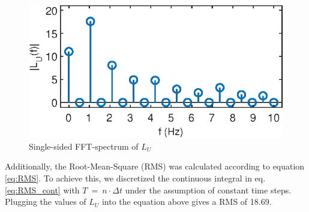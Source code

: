 \begin{figure}[h] 
  \centering
  \includegraphics[scale=1]{ue1/L_U_fft.eps} %
  \caption{Single-sided FFT-spectrum of $L_U$}
  \label{fig:Lu_fft}
\end{figure}
Additionally, the Root-Mean-Square (RMS) was calculated according to equation \ref{eq:RMS}. To achieve this, we discretized the continuous integral in eq. \ref{eq:RMS_cont} with $T\ =\ n \cdot \Delta t$ under the assumption of constant time steps. Plugging the values of $L_U$ into the equation above gives a RMS of 18.69.